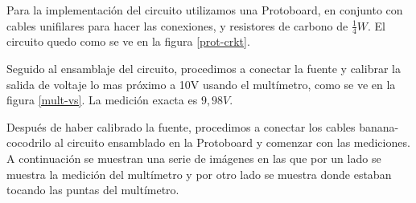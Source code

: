 \documentclass[a4paper,12pt, spanish]{report}
\begin{document}
      Para la implementación del circuito utilizamos una Protoboard, en conjunto con cables unifilares para hacer 
      las conexiones, y resistores de carbono de $\tfrac{1}{4}W$. El circuito quedo como se ve en la figura 
      \ref{prot-crkt}.

      Seguido al ensamblaje del circuito, procedimos a conectar la fuente y calibrar la salida de voltaje lo mas
      próximo a 10V usando el multímetro, como se ve en la figura \ref{mult-vs}. La medición exacta es $9,98V$.

      Después de haber calibrado la fuente, procedimos a conectar los cables banana-cocodrilo al circuito ensamblado
      en la Protoboard y comenzar con las mediciones. A continuación se muestran una serie de imágenes en las que por
      un lado se muestra la medición del multímetro y por otro lado se muestra donde estaban tocando las puntas del
      multímetro.
\end{document}
